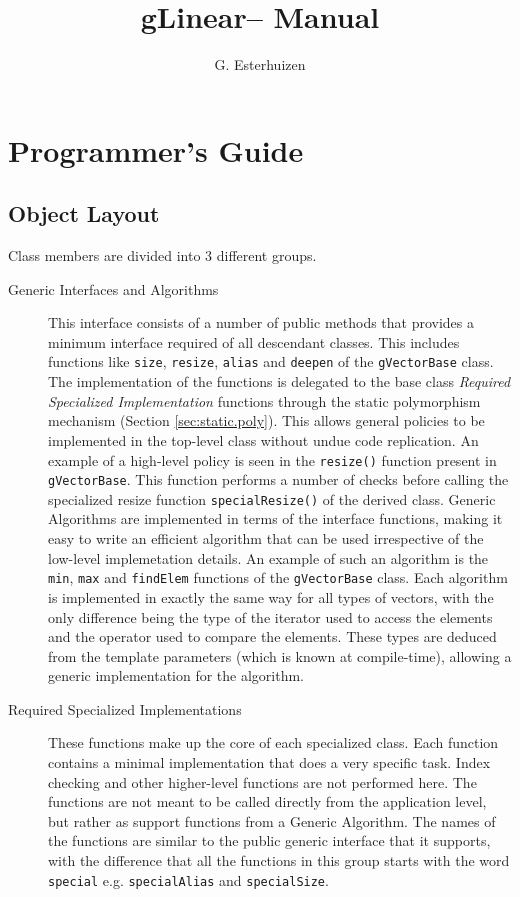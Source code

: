 \documentclass[12pt,a4paper]{book}
\begin{document}
\newcommand{\gLinear}{gLinear}
\newcommand{\ident}[1]{\texttt{#1}}
\title{\gLinear -- Manual}
\author{G. Esterhuizen}
\maketitle

\chapter{Programmer's Guide}

\section{Object Layout}
Class members are divided into 3 different groups.

\begin{description}
  \item [Generic Interfaces and Algorithms]
    This interface consists of a number of public methods that provides
    a minimum interface required of all descendant classes. This
    includes functions like \ident{size}, \ident{resize}, \ident{alias}
    and \ident{deepen} of the \ident{gVectorBase} class. The
    implementation of the functions is delegated to the base class
    \emph{Required Specialized Implementation} functions through the
    static polymorphism mechanism (Section \ref{sec:static.poly}). This
    allows general policies to be implemented in the top-level class
    without undue code replication. An example of a high-level policy is
    seen in the \ident{resize()} function present in
    \ident{gVectorBase}. This function performs a number of checks
    before calling the specialized resize function
    \ident{specialResize()} of the derived class. Generic Algorithms are
    implemented in terms of the interface functions, making it easy to
    write an efficient algorithm that can be used irrespective of the
    low-level implemetation details. An example of such an algorithm is
    the \ident{min}, \ident{max} and \ident{findElem} functions of the
    \ident{gVectorBase} class. Each algorithm is implemented in exactly
    the same way for all types of vectors, with the only difference
    being the type of the iterator used to access the elements and the
    operator used to compare the elements. These types are deduced from
    the template parameters (which is known at compile-time), allowing a
    generic implementation for the algorithm.
    
  \item [Required Specialized Implementations]
    These functions make up the core of each specialized class. Each
    function contains a minimal implementation that does a very specific
    task. Index checking and other higher-level functions are not performed
    here. The functions are not meant to be called directly from the
    application level, but rather as support functions from a Generic
    Algorithm. The names of the functions are similar to the public generic
    interface that it supports, with the difference that all the functions
    in this group starts with the word \ident{special} e.g.
    \ident{specialAlias} and \ident{specialSize}.
    

\end{description}
\end{document}
